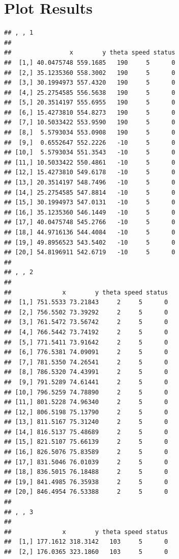\documentclass{article}\usepackage[]{graphicx}\usepackage[]{color}
\makeatletter
\newenvironment{kframe}{%
 \def\at@end@of@kframe{}%
 \ifinner\ifhmode%
  \def\at@end@of@kframe{\end{minipage}}%
  \begin{minipage}{\columnwidth}%
 \fi\fi%
 \def\FrameCommand##1{\hskip\@totalleftmargin \hskip-\fboxsep
 \colorbox{shadecolor}{##1}\hskip-\fboxsep
     \hskip-\linewidth \hskip-\@totalleftmargin \hskip\columnwidth}%
 \MakeFramed {\advance\hsize-\width
   \@totalleftmargin\z@ \linewidth\hsize
   \@setminipage}}%
 {\par\unskip\endMakeFramed%
 \at@end@of@kframe}
\newenvironment{knitrout}{}{} %
\makeatother
\begin{document}
\section{Plot Results}

\begin{knitrout}
\color{fgcolor}\begin{kframe}
\begin{verbatim}
## , , 1
## 
##                x        y theta speed status
##  [1,] 40.0475748 559.1685   190     5      0
##  [2,] 35.1235360 558.3002   190     5      0
##  [3,] 30.1994973 557.4320   190     5      0
##  [4,] 25.2754585 556.5638   190     5      0
##  [5,] 20.3514197 555.6955   190     5      0
##  [6,] 15.4273810 554.8273   190     5      0
##  [7,] 10.5033422 553.9590   190     5      0
##  [8,]  5.5793034 553.0908   190     5      0
##  [9,]  0.6552647 552.2226   -10     5      0
## [10,]  5.5793034 551.3543   -10     5      0
## [11,] 10.5033422 550.4861   -10     5      0
## [12,] 15.4273810 549.6178   -10     5      0
## [13,] 20.3514197 548.7496   -10     5      0
## [14,] 25.2754585 547.8814   -10     5      0
## [15,] 30.1994973 547.0131   -10     5      0
## [16,] 35.1235360 546.1449   -10     5      0
## [17,] 40.0475748 545.2766   -10     5      0
## [18,] 44.9716136 544.4084   -10     5      0
## [19,] 49.8956523 543.5402   -10     5      0
## [20,] 54.8196911 542.6719   -10     5      0
## 
## , , 2
## 
##              x        y theta speed status
##  [1,] 751.5533 73.21843     2     5      0
##  [2,] 756.5502 73.39292     2     5      0
##  [3,] 761.5472 73.56742     2     5      0
##  [4,] 766.5442 73.74192     2     5      0
##  [5,] 771.5411 73.91642     2     5      0
##  [6,] 776.5381 74.09091     2     5      0
##  [7,] 781.5350 74.26541     2     5      0
##  [8,] 786.5320 74.43991     2     5      0
##  [9,] 791.5289 74.61441     2     5      0
## [10,] 796.5259 74.78890     2     5      0
## [11,] 801.5228 74.96340     2     5      0
## [12,] 806.5198 75.13790     2     5      0
## [13,] 811.5167 75.31240     2     5      0
## [14,] 816.5137 75.48689     2     5      0
## [15,] 821.5107 75.66139     2     5      0
## [16,] 826.5076 75.83589     2     5      0
## [17,] 831.5046 76.01039     2     5      0
## [18,] 836.5015 76.18488     2     5      0
## [19,] 841.4985 76.35938     2     5      0
## [20,] 846.4954 76.53388     2     5      0
## 
## , , 3
## 
##              x        y theta speed status
##  [1,] 177.1612 318.3142   103     5      0
##  [2,] 176.0365 323.1860   103     5      0

\end{verbatim}
\end{kframe}
\end{knitrout}
\end{document}
